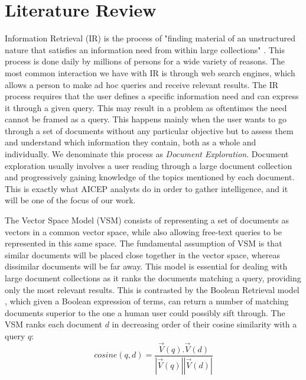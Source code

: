 \documentclass[a4paper]{article}
\begin{document}
\section*{Literature Review}
Information Retrieval (IR) is the process of "finding material of an unstructured nature that satisfies an information need from within large collections" \citep[p.~1]{schutze2008}. This process is done daily by millions of persons for a wide variety of reasons. The most common interaction we have with IR is through web search engines, which allows a person to make ad hoc queries and receive relevant results. The IR process requires that the user defines a specific information need and can express it through a given query. This may result in a problem as oftentimes the need cannot be framed as a query. This happens mainly when the user wants to go through a set of documents without any particular objective but to assess them and understand which information they contain, both as a whole and individually. We denominate this process as \textit{Document Exploration}. Document exploration usually involves a user reading through a large document collection and progressively gaining knowledge of the topics mentioned by each document. This is exactly what AICEP analysts do in order to gather intelligence, and it will be one of the focus of our work. 

The Vector Space Model (VSM) \citep[p.~120-126]{schutze2008} consists of representing a set of documents as vectors in a common vector space, while also allowing free-text queries to be represented in this same space. The fundamental assumption of VSM is that similar documents will be placed close together in the vector space, whereas dissimilar documents will be far away. This model is essential for dealing with large document collections as it ranks the documents matching a query, providing only the most relevant results. This is contrasted by the Boolean Retrieval model \citep[p.~1-18]{schutze2008}, which given a Boolean expression of terms, can return a number of matching documents superior to the one a human user could possibly sift through. The VSM ranks each document $d$ in decreasing order of their cosine similarity with a query $q$: 
\begin{equation}
	cosine(q,d) = \frac{\overrightarrow{V}(q).\overrightarrow{V}(d)}{|\overrightarrow{V}(q)||\overrightarrow{V}(d)|}
\end{equation}
\end{document}
